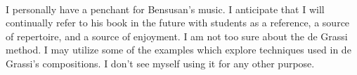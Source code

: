 \documentclass[12pt]{article}
\begin{document}
\strut\\
I personally have a penchant for Bensusan's music. I anticipate that I will continually refer to his book in the future with students as a reference, a source of repertoire, and a source of enjoyment. I am not too sure about the de Grassi method. I may utilize some of the examples which explore techniques used in de Grassi's compositions. I don't see myself using it for any other purpose.
\end{document}
